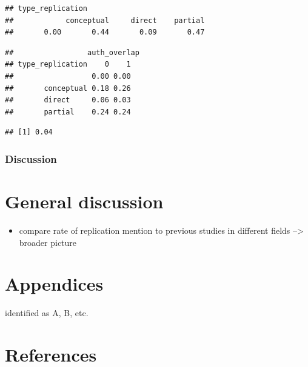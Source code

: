 \documentclass[]{elsarticle} %
\providecommand{\tightlist}{%
  \setlength{\itemsep}{0pt}\setlength{\parskip}{0pt}}
\begin{document}
\begin{verbatim}
## type_replication
##            conceptual     direct    partial 
##       0.00       0.44       0.09       0.47
\end{verbatim}

\begin{verbatim}
##                 auth_overlap
## type_replication    0    1
##                  0.00 0.00
##       conceptual 0.18 0.26
##       direct     0.06 0.03
##       partial    0.24 0.24
\end{verbatim}

\begin{verbatim}
## [1] 0.04
\end{verbatim}

\hypertarget{discussion-1}{%
\subsubsection{Discussion}\label{discussion-1}}

\hypertarget{general-discussion}{%
\section{General discussion}\label{general-discussion}}

\begin{itemize}
\tightlist
\item
  compare rate of replication mention to previous studies in different
  fields --\textgreater{} broader picture
\end{itemize}

\hypertarget{appendices}{%
\section{Appendices}\label{appendices}}

identified as A, B, etc.

\hypertarget{references}{%
\section*{References}\label{references}}
\end{document}

